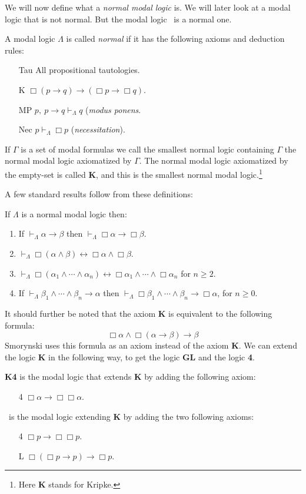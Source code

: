 \documentclass[../main.tex]{subfiles}
\begin{document}
We will now define what a \textit{normal modal logic} is. We will later look at
a modal logic that is not normal. But the modal logic \GL\ is a normal one.
\begin{defi}
	A modal logic $\Lambda$ is called \textit{normal} if it has the following
	axioms and deduction rules:
	\begin{enumerate}
		\item[Tau] All propositional tautologies. 
		\item[K] $\Box(p\rightarrow q)\rightarrow(\Box p\rightarrow\Box
			q)$.
		\item[MP] $p,\ p\rightarrow q \vdash_\Lambda q$
			(\textit{modus ponens}.
		\item[Nec] $p \vdash_\Lambda\Box p$ (\textit{necessitation}).
	\end{enumerate}
	If $\Gamma$ is a set of modal formulas we call the smallest normal
	logic containing $\Gamma$ the normal modal logic axiomatized by
	$\Gamma$. The normal modal logic axiomatized by the empty-set is called
	\textbf{K}, and
	this is the smallest normal modal logic.\footnote{Here \textbf{K}
	stands for Kripke.}
\end{defi}
A few standard results follow from these definitions:
\begin{prop}
	If $\Lambda$ is a normal modal logic then:
	\begin{enumerate}
		\item If $\vdash_\Lambda\alpha\rightarrow\beta$ then
		$\vdash_\Lambda\Box\alpha\rightarrow\Box\beta$.
	\item
		$\vdash_\Lambda\Box(\alpha\wedge\beta)\leftrightarrow\Box\alpha\wedge\Box\beta$.
	\item
		$\vdash_\Lambda\Box(\alpha_1\wedge\cdots\wedge\alpha_n)\leftrightarrow
		\Box\alpha_1\wedge\cdots\wedge\Box\alpha_n$ for $n\geq 2$.
	\item If
		$\vdash_\Lambda\beta_1\wedge\cdots\wedge\beta_n\rightarrow\alpha$
		then
		$\vdash_\Lambda\Box\beta_1\wedge\cdots\wedge\beta_n\rightarrow\Box\alpha$,
		for $n\geq 0$.
	\end{enumerate}
\end{prop}
It should further be noted that the axiom \textbf{K} is equivalent to the
following formula:
\[\Box\alpha\wedge\Box(\alpha\rightarrow\beta)\rightarrow\beta\]
Smorynski uses this formula as an axiom instead of the axiom \textbf{K}.
We can extend the logic \textbf{K} in the following way, to get the logic
\textbf{GL} and the logic \textbf{4}.
\begin{defi}
	\textbf{K4} is the modal logic that extends \textbf{K} by adding the
	following axiom:
	\begin{enumerate}
		\item[4] $\Box\alpha\rightarrow\Box\Box\alpha$.
	\end{enumerate}
	\GL\ is the modal logic extending \textbf{K} by adding the two following
	axioms:
	\begin{enumerate}
		\item[4] $\Box p\rightarrow\Box\Box p$.
		\item[L]
			$\Box(\Box p\rightarrow p)\rightarrow\Box p$.
	\end{enumerate}
\end{defi}
\end{document}
